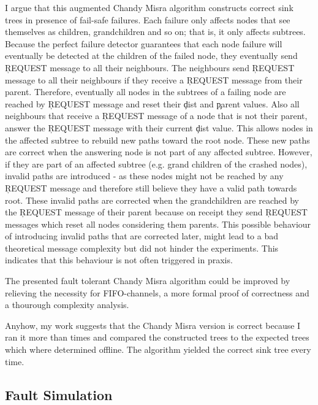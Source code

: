   I argue that this augmented Chandy Misra algorithm constructs correct sink trees in presence of fail-safe failures. 
  Each failure only affects nodes that see themselves as children, grandchildren and so on; that is, it only affects subtrees.
  Because the perfect failure detector guarantees that each node failure will eventually be detected at the children of the failed node, they eventually send \c{REQUEST} message to all their neighbours.
  The neighbours send \c{REQUEST} message to all their neighbours if they receive a \c{REQUEST} message from their parent. 
  Therefore, eventually all nodes in the subtrees of a failing node are reached by \c{REQUEST} message and reset their \c{dist} and \c{parent} values.
  Also all neighbours that receive a \c{REQUEST} message of a node that is not their parent, answer the \c{REQUEST} message with their current \c{dist} value.
  This allows nodes in the affected subtree to rebuild new paths toward the root node.
  These new paths are correct when the answering node is not part of any affected subtree.
  However, if they are part of an affected subtree (e.g. grand children of the crashed nodes), invalid paths are introduced - as these nodes might not be reached by any \c{REQUEST} message and therefore still believe they have a valid path towards root.
  These invalid paths are corrected when the grandchildren are reached by the \c{REQUEST} message of their parent because on receipt they send \c{REQUEST} messages which reset all nodes considering them
  parents. 
  This possible behaviour of introducing invalid paths that are corrected later, might lead to a bad theoretical message complexity but did not hinder the experiments.
  This indicates that this behaviour is not often triggered in praxis.
  
  The presented fault tolerant Chandy Misra algorithm could be improved by relieving the necessity for FIFO-channels, a more formal proof of correctness and a thourough complexity analysis.

  Anyhow, my work suggests that the Chandy Misra version is correct because I ran it more than %
  times and compared the constructed trees to the expected trees which where determined offline. The algorithm yielded the correct sink tree every time.
  
  
  
\subsection{Fault Simulation}

